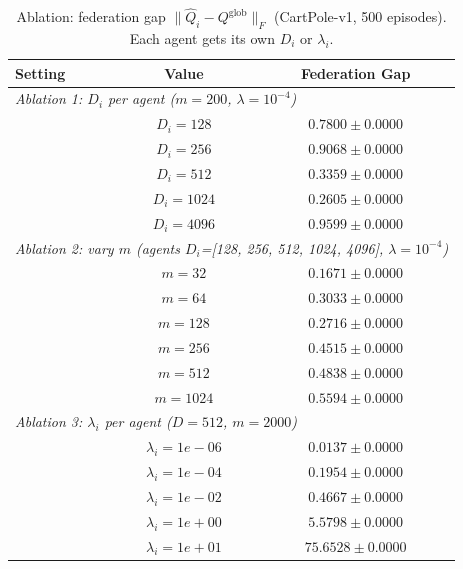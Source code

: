 \begin{table}[t]
  \centering
  \caption{Ablation: federation gap $\|\hat{Q}_i - Q^\mathrm{glob}\|_F$ (CartPole-v1, 500 episodes). Each agent gets its own $D_i$ or $\lambda_i$.}
  \label{tab:ablation}
  \begin{tabular}{lcc}
  \toprule
  Setting & Value & Federation Gap \\
  \midrule
  \multicolumn{3}{l}{\emph{Ablation 1: $D_i$ per agent ($m=200$, $\lambda=10^{-4}$)}} \\
  & $D_i=128$ & $0.7800\pm0.0000$ \\
  & $D_i=256$ & $0.9068\pm0.0000$ \\
  & $D_i=512$ & $0.3359\pm0.0000$ \\
  & $D_i=1024$ & $0.2605\pm0.0000$ \\
  & $D_i=4096$ & $0.9599\pm0.0000$ \\
  \midrule
  \multicolumn{3}{l}{\emph{Ablation 2: vary $m$ (agents $D_i$=[128, 256, 512, 1024, 4096], $\lambda=10^{-4}$)}} \\
  & $m=32$ & $0.1671\pm0.0000$ \\
  & $m=64$ & $0.3033\pm0.0000$ \\
  & $m=128$ & $0.2716\pm0.0000$ \\
  & $m=256$ & $0.4515\pm0.0000$ \\
  & $m=512$ & $0.4838\pm0.0000$ \\
  & $m=1024$ & $0.5594\pm0.0000$ \\
  \midrule
  \multicolumn{3}{l}{\emph{Ablation 3: $\lambda_i$ per agent ($D=512$, $m=2000$)}} \\
  & $\lambda_i=1e-06$ & $0.0137\pm0.0000$ \\
  & $\lambda_i=1e-04$ & $0.1954\pm0.0000$ \\
  & $\lambda_i=1e-02$ & $0.4667\pm0.0000$ \\
  & $\lambda_i=1e+00$ & $5.5798\pm0.0000$ \\
  & $\lambda_i=1e+01$ & $75.6528\pm0.0000$ \\
  \bottomrule
  \end{tabular}
\end{table}